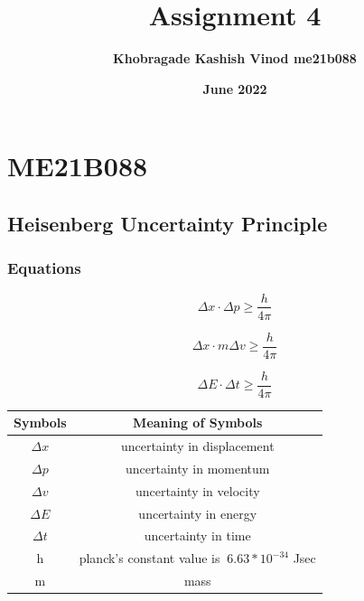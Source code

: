 \section{ME21B088}

\title{\textbf {Assignment 4} }
\author{\textbf {Khobragade Kashish Vinod me21b088} }
\date{\textbf {June 2022} }

\maketitle

\subsection{Heisenberg Uncertainty Principle}

\subsubsection{Equations}

\begin{equation}
   \Delta x\cdot\Delta p\geq \frac {h}{4\pi}
\end{equation}
  
\begin{equation}
    \Delta x\cdot m\Delta v\geq \frac {h}{4\pi}
\end{equation} 

\begin{equation}
     \Delta E\cdot \Delta t\geq \frac {h}{4\pi}
\end{equation}

\begin{center}
\begin{tabular}{|c|c|}
    \hline
    \textbf{Symbols} & \textbf{Meaning of Symbols} \\
    \hline
    $\Delta x$ & uncertainty in displacement \\
    \hline
    $\Delta p$ & uncertainty in momentum \\
    \hline
    $\Delta v$ & uncertainty in velocity \\
    \hline
    $\Delta E$ & uncertainty in energy \\
    \hline
    $\Delta t$ & uncertainty in time \\
    \hline
    h &  planck's constant value is $\ 6.63*{10}^{-34}$ Jsec \\
    \hline
    m & mass  \\
    \hline
\end{tabular}
\end{center}


